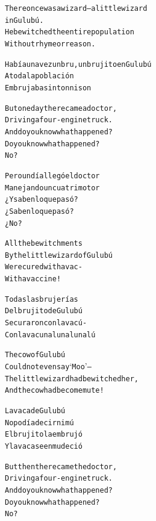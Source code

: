\documentclass[11pt]{article}
\begin{document}
\begin{parcolumns}{2}

\colchunk
{
\begin{alltt}\normalfont
There once was a wizard – a little wizard
in Gulubú.
He bewitched the entire population
Without rhyme or reason.
\end{alltt}
}

\colchunk
{
\begin{alltt}\normalfont
Había una vez un bru, un brujito en Gulubú
A toda la población
Embrujaba sin ton ni son
\end{alltt}
}

\colplacechunks

\colchunk
{
\begin{alltt}\normalfont
But one day there came a doctor,
Driving a four-engine truck.
And do you know what happened?
Do you know what happened?
No?
\end{alltt}
}

\colchunk
{
\begin{alltt}\normalfont
Pero un día llegó el doctor
Manejando un cuatrimotor
¿Y saben lo que pasó?
¿Saben lo que pasó?
¿No?
\end{alltt}
}

\colplacechunks

\colchunk
{
\begin{alltt}\normalfont
All the bewitchments
By the little wizard of Gulubú
Were cured with a vac-
With a vaccine!
\end{alltt}
}

\colchunk
{
\begin{alltt}\normalfont
Todas las brujerías
Del brujito de Gulubú
Se curaron con la vacú-
Con la vacuna luna luna lú
\end{alltt}
}

\colplacechunks

\colchunk
{
\begin{alltt}\normalfont
The cow of Gulubú
Could not even say ‘Moo’ –
The little wizard had bewitched her,
And the cow had become mute!
\end{alltt}
}

\colchunk
{
\begin{alltt}\normalfont
La vaca de Gulubú
No podía decir ni mú
El brujito la embrujó
Y la vaca se enmudeció
\end{alltt}
}

\colplacechunks

\colchunk
{
\begin{alltt}\normalfont
But then there came the doctor,
Driving a four-engine truck.
And do you know what happened?
Do you know what happened?
No?
\end{alltt}
}


\end{parcolumns}
\end{document}
